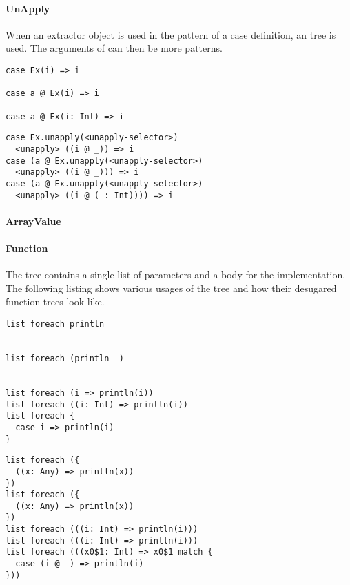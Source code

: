 \paragraph{UnApply} 

\noindent When an extractor object is used in the pattern of a case definition, an  tree is used. The arguments of  can then be more  patterns.

\begin{multicols}{2}
\begin{lstlisting}
case Ex(i) => i

case a @ Ex(i) => i

case a @ Ex(i: Int) => i

\end{lstlisting}
\begin{lstlisting}
case Ex.unapply(<unapply-selector>) 
  <unapply> ((i @ _)) => i
case (a @ Ex.unapply(<unapply-selector>) 
  <unapply> ((i @ _))) => i
case (a @ Ex.unapply(<unapply-selector>) 
  <unapply> ((i @ (_: Int)))) => i
\end{lstlisting}
\end{multicols}

\paragraph{ArrayValue} 

\paragraph{Function} 

\noindent The  tree contains a single list of parameters and a body for the implementation. The following listing shows various usages of the  tree and how their desugared function trees look like.

\begin{multicols}{2}
\begin{lstlisting}
list foreach println


list foreach (println _)


list foreach (i => println(i))
list foreach ((i: Int) => println(i))
list foreach {
  case i => println(i)
}
\end{lstlisting}
\begin{lstlisting}
list foreach ({
  ((x: Any) => println(x))
})
list foreach ({
  ((x: Any) => println(x))
})
list foreach (((i: Int) => println(i)))
list foreach (((i: Int) => println(i)))
list foreach (((x0$1: Int) => x0$1 match {
  case (i @ _) => println(i)
}))
\end{lstlisting}
\end{multicols}

